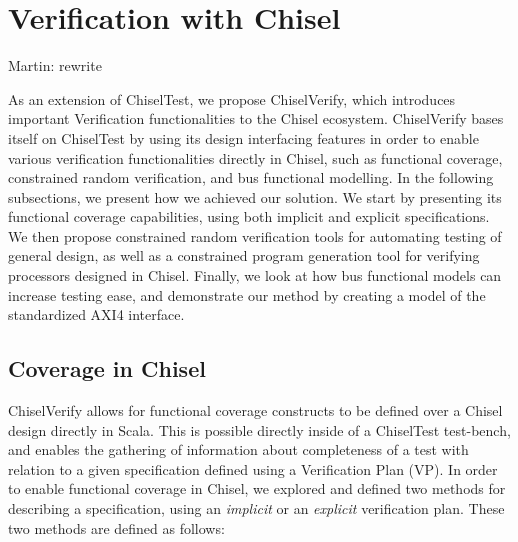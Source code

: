 \documentclass[conference]{IEEEtran}
\newcommand{\martin}[1]{{\color{blue} Martin: #1}}
\begin{document}
\section{Verification with Chisel}

\martin{rewrite}

As an extension of ChiselTest, we propose ChiselVerify, which introduces important Verification functionalities to the Chisel ecosystem.
ChiselVerify bases itself on ChiselTest by using its design interfacing features in order to enable various verification functionalities directly in Chisel, such as functional coverage, constrained random verification, and bus functional modelling. 
In the following subsections, we present how we achieved our solution.
We start by presenting its functional coverage capabilities,  using both implicit and explicit specifications.
We then propose constrained random verification tools for automating testing of general design, as well as a constrained program generation tool for verifying processors designed in Chisel.
Finally, we look at how bus functional models can increase testing ease, and demonstrate our method by creating a model of the standardized AXI4 interface. 


\subsection{Coverage in Chisel}
ChiselVerify allows for functional coverage constructs to be defined over a Chisel design directly in Scala. 
This is possible directly inside of a ChiselTest test-bench, and enables the gathering of information about completeness of a test with relation to a given specification defined using a Verification Plan (VP).
In order to enable functional coverage in Chisel, we explored and defined two methods for describing a specification, using an \emph{implicit} or an \emph{explicit} verification plan.
These two methods are defined as follows:
\end{document}
